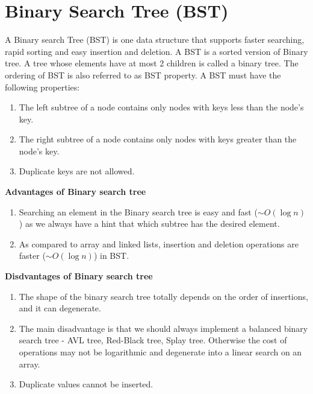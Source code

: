 \documentclass[a4paper,11pt]{book}
\begin{document}
\section{Binary Search Tree (BST)}

A Binary search Tree (BST) is one data structure that supports faster searching, rapid sorting and easy insertion and deletion. A BST is a sorted version of Binary tree. A tree whose elements have at most 2 children is called a binary tree. The ordering of BST is also referred to as BST property. A BST must have the following properties:
\begin{enumerate}
\item The left subtree of a node contains only nodes with keys less than the node's key.
\item The right subtree of a node contains only nodes with keys greater than the node's key.
\item Duplicate keys are not allowed.
\end{enumerate}

\begin{center}
\end{center}

\textbf{Advantages of Binary search tree}
\begin{enumerate}
    \item Searching an element in the Binary search tree is easy and fast ($\sim O(\log n)$) as we always have a hint that which subtree has the desired element.
    \item As compared to array and linked lists, insertion and deletion operations are faster ($\sim O(\log n)$) in BST.
\end{enumerate}

\textbf{Disdvantages of Binary search tree}
\begin{enumerate}
    \item The shape of the binary search tree totally depends on the order of insertions, and it can degenerate.
    \item The main disadvantage is that we should always implement a balanced binary search tree - AVL tree, Red-Black tree, Splay tree. Otherwise the cost of operations may not be logarithmic and degenerate into a linear search on an array.
    \item Duplicate values cannot be inserted.
\end{enumerate}
\end{document}
